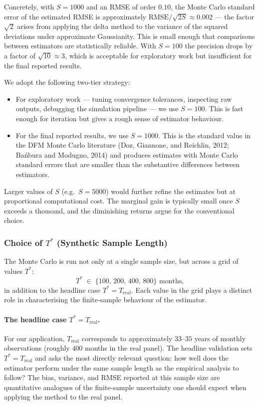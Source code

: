 \documentclass[11pt, a4paper, oneside]{article}
\begin{document}
Concretely, with $S = 1000$ and an RMSE of order $0.10$, the Monte
Carlo standard error of the estimated RMSE is approximately
$\mathrm{RMSE}/\sqrt{2S} \approx 0.002$ — the factor $\sqrt{2}$
arises from applying the delta method to the variance of the
squared deviations under approximate Gaussianity. This is small
enough that comparisons between estimators are statistically
reliable. With $S = 100$ the precision drops by a factor of $\sqrt{10} \approx 3$,
which is acceptable for exploratory work but insufficient for the
final reported results.

We adopt the following two-tier strategy:
\begin{itemize}[leftmargin=1.5em, itemsep=3pt]
    \item For exploratory work — tuning convergence tolerances,
          inspecting raw outputs, debugging the simulation pipeline
          — we use $S = 100$. This is fast enough for iteration but
          gives a rough sense of estimator behaviour.
    \item For the final reported results, we use $S = 1000$. This is
          the standard value in the DFM Monte Carlo literature
          (Doz, Giannone, and Reichlin, 2012; Bańbura and Modugno,
          2014) and produces estimates with Monte Carlo standard
          errors that are smaller than the substantive differences
          between estimators.
\end{itemize}
Larger values of $S$ (e.g.\ $S = 5000$) would further refine the
estimates but at proportional computational cost. The marginal gain
is typically small once $S$ exceeds a thousand, and the diminishing
returns argue for the conventional choice.

\subsubsection{Choice of $T^*$ (Synthetic Sample Length)}

The Monte Carlo is run not only at a single sample size, but
across a grid of values $T^*$:
\[
T^* \;\in\; \{100,\, 200,\, 400,\, 800\} \text{ months,}
\]
in addition to the headline case $T^* = T_{\mathrm{real}}$. Each
value in the grid plays a distinct role in characterising the
finite-sample behaviour of the estimator.

\paragraph{The headline case $T^* = T_{\mathrm{real}}$.}
For our application, $T_{\mathrm{real}}$ corresponds to
approximately $33$--$35$ years of monthly observations
(roughly $400$ months in the real panel). The headline validation
sets $T^* = T_{\mathrm{real}}$ and asks the most directly relevant
question: how well does the estimator perform under the same
sample length as the empirical analysis to follow? The bias,
variance, and RMSE reported at this sample size are quantitative
analogues of the finite-sample uncertainty one should expect when
applying the method to the real panel.
\end{document}
